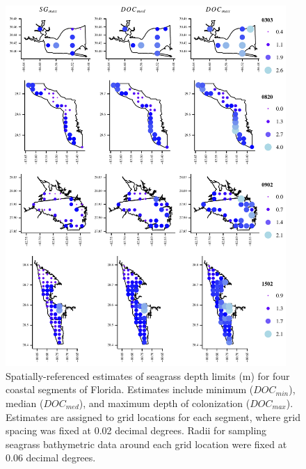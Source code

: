 \documentclass[letterpaper,12pt,oneside]{article}\usepackage[]{graphicx}\usepackage[]{color}
\begin{document}
\begin{figure}
\centering
\includegraphics[width = 0.95\textwidth]{figs/all_ests.pdf}
\caption{Spatially-referenced estimates of seagrass depth limits (m) for four coastal segments of Florida.  Estimates include minimum ($DOC_{min}$), median ($DOC_{med}$), and maximum depth of colonization ($DOC_{max}$).  Estimates are assigned to grid locations for each segment, where grid spacing was fixed at 0.02 decimal degrees.  Radii for sampling seagrass bathymetric data around each grid location were fixed at 0.06 decimal degrees.}
\label{fig:all_ests}
\end{figure}

\end{document}
